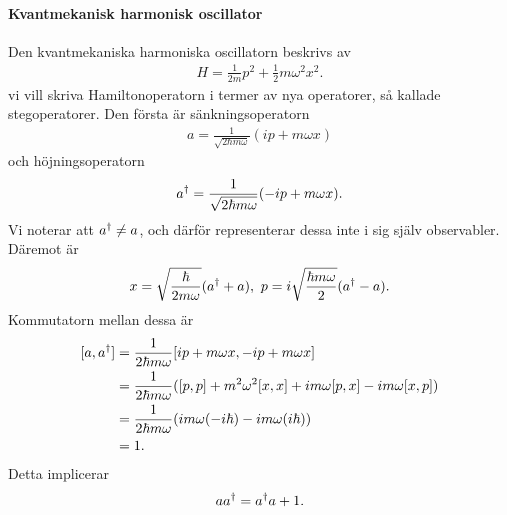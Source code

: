 \paragraph{Kvantmekanisk harmonisk oscillator}
Den kvantmekaniska harmoniska oscillatorn beskrivs av
\begin{align*}
	H = \frac{1}{2m}p^{2} + \frac{1}{2}m\omega^{2}x^{2}.
\end{align*}
vi vill skriva Hamiltonoperatorn i termer av nya operatorer, så kallade stegoperatorer. Den första är sänkningsoperatorn
\begin{align*}
	a = \frac{1}{\sqrt{2\hbar m\omega}}(ip + m\omega x)
\end{align*}
och höjningsoperatorn
\begin{align*}
	a^{\dagger} = \frac{1}{\sqrt{2\hbar m\omega}}(-ip + m\omega x).
\end{align*}
Vi noterar att $a^{\dagger} \neq a$, och därför representerar dessa inte i sig själv observabler. Däremot är
\begin{align*}
	x = \sqrt{\frac{\hbar}{2m\omega}}(a^{\dagger} + a),\ p = i\sqrt{\frac{\hbar m\omega}{2}}(a^{\dagger} - a).
\end{align*}
Kommutatorn mellan dessa är
\begin{align*}
	[a, a^{\dagger}] &= \frac{1}{2\hbar m\omega}[ip + m\omega x, -ip + m\omega x] \\
	                    &= \frac{1}{2\hbar m\omega}([p, p] + m^{2}\omega^{2}[x, x] + im\omega[p, x] - im\omega[x, p]) \\
	                    &= \frac{1}{2\hbar m\omega}(im\omega(-i\hbar) - im\omega(i\hbar)) \\
	                    &= 1.
\end{align*}
Detta implicerar
\begin{align*}
	aa^{\dagger} = a^{\dagger}a + 1.
\end{align*}

